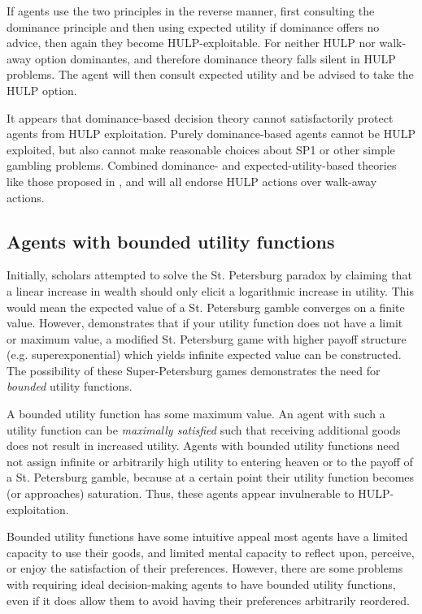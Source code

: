 \documentclass{article}
\begin{document}
If agents use the two principles in the reverse manner, first consulting the dominance principle and then using expected utility if dominance offers no advice, then again they become HULP-exploitable. For neither HULP nor walk-away option dominantes, and therefore dominance theory falls silent in HULP problems. The agent will then consult expected utility and be advised to take the HULP option.

It appears that dominance-based decision theory cannot satisfactorily protect agents from HULP exploitation. Purely dominance-based agents cannot be HULP exploited, but also cannot make reasonable choices about SP1 or other simple gambling problems. Combined dominance- and expected-utility-based theories like those proposed in \citep{colyvan2008relative}, \citep{colyvan2006no} and \citep{easwaran2009dominance} will all endorse HULP actions over walk-away actions. 

\subsection{Agents with bounded utility functions}

Initially, scholars attempted to solve the St. Petersburg paradox by claiming that a linear increase in wealth should only elicit a logarithmic increase in utility. This would mean the expected value of a St. Petersburg gamble converges on a finite value. However, \citep{menger1934petersburg} demonstrates that if your utility function does not have a limit or maximum value, a modified St. Petersburg game with higher payoff structure (e.g. superexponential) which yields infinite expected value can be constructed. The possibility of these Super-Petersburg games demonstrates the need for \textit{bounded} utility functions.

A bounded utility function has some maximum value. An agent with such a utility function can be \textit{maximally satisfied} such that receiving additional goods does not result in increased utility. Agents with bounded utility functions need not assign infinite or arbitrarily high utility to entering heaven or to the payoff of a St. Petersburg gamble, because at a certain point their utility function becomes (or approaches) saturation. Thus, these agents appear invulnerable to HULP-exploitation. 

Bounded utility functions have some intuitive appeal \textemdash{} most agents have a limited capacity to use their goods, and limited mental capacity to reflect upon, perceive, or enjoy the satisfaction of their preferences. However, there are some problems with requiring ideal decision-making agents to have bounded utility functions, even if it does allow them to avoid having their preferences arbitrarily reordered. 
\end{document}

